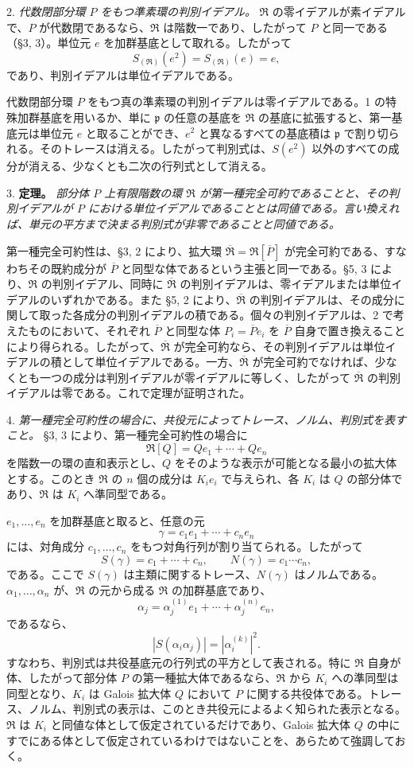 \documentclass[11pt]{article}
\providecommand{\mR}{\mathfrak{R}}
\providecommand{\bR}{\overline{\mathfrak{R}}}
\providecommand{\mpideal}{\mathfrak{p}}
\providecommand{\bP}{\overline{P}}
\begin{document}
2. \emph{代数閉部分環 $P$ をもつ準素環の判別イデアル。} $\mR$ の零イデアルが素イデアルで、$P$ が代数閉であるなら、$\mR$ は階数一であり、したがって $P$ と同一である（\S 3, 3）。単位元 $e$ を加群基底として取れる。したがって
\[
        S_{(\mR)}(e^2)=S_{(\mR)}(e)=e,
\]
であり、判別イデアルは単位イデアルである。

代数閉部分環 $P$ をもつ真の準素環の判別イデアルは零イデアルである。1 の特殊加群基底を用いるか、単に $\mpideal$ の任意の基底を $\mR$ の基底に拡張すると、第一基底元は単位元 $e$ と取ることができ、$e^2$ と異なるすべての基底積は $\mpideal$ で割り切られる。そのトレースは消える。したがって判別式は、$S(e^2)$ 以外のすべての成分が消える、少なくとも二次の行列式として消える。

3. \textbf{定理。} \emph{部分体 $P$ 上有限階数の環 $\mR$ が第一種完全可約であることと、その判別イデアルが $P$ における単位イデアルであることとは同値である。言い換えれば、単元の平方まで決まる判別式が非零であることと同値である。}

第一種完全可約性は、\S 3, 2 により、拡大環 $\bR=\mR[\bP]$ が完全可約である、すなわちその既約成分が $\bP$ と同型な体であるという主張と同一である。\S 5, 3 により、$\mR$ の判別イデアル、同時に $\bR$ の判別イデアルは、零イデアルまたは単位イデアルのいずれかである。また \S 5, 2 により、$\bR$ の判別イデアルは、その成分に関して取った各成分の判別イデアルの積である。個々の判別イデアルは、2 で考えたものにおいて、それぞれ $\bP$ と同型な体 $P_i=\bP e_i$ を $\bP$ 自身で置き換えることにより得られる。したがって、$\bR$ が完全可約なら、その判別イデアルは単位イデアルの積として単位イデアルである。一方、$\bR$ が完全可約でなければ、少なくとも一つの成分は判別イデアルが零イデアルに等しく、したがって $\bR$ の判別イデアルは零である。これで定理が証明された。

4. \emph{第一種完全可約性の場合に、共役元によってトレース、ノルム、判別式を表すこと。} \S 3, 3 により、第一種完全可約性の場合に
\[
        \mR[Q]=Qe_1+\cdots+Qe_n
\]
を階数一の環の直和表示とし、$Q$ をそのような表示が可能となる最小の拡大体とする。このとき $\mR$ の $n$ 個の成分は $K_i e_i$ で与えられ、各 $K_i$ は $Q$ の部分体であり、$\mR$ は $K_i$ へ準同型である。

$e_1,\ldots,e_n$ を加群基底と取ると、任意の元
\[
        \gamma=c_1e_1+\cdots+c_ne_n
\]
には、対角成分 $c_1,\ldots,c_n$ をもつ対角行列が割り当てられる。したがって
\[
        S(\gamma)=c_1+\cdots+c_n,
        \qquad
        N(\gamma)=c_1\cdots c_n,
\]
である。ここで $S(\gamma)$ は主類に関するトレース、$N(\gamma)$ はノルムである。$\alpha_1,\ldots,\alpha_n$ が、$\mR$ の元から成る $\mR$ の加群基底であり、
\[
        \alpha_j=\alpha_j^{(1)}e_1+\cdots+\alpha_j^{(n)}e_n,
\]
であるなら、
\[
        |S(\alpha_i\alpha_j)|=
        \left|\alpha_i^{(k)}\right|^2.
\]
すなわち、判別式は共役基底元の行列式の平方として表される。特に $\mR$ 自身が体、したがって部分体 $P$ の第一種拡大体であるなら、$\mR$ から $K_i$ への準同型は同型となり、$K_i$ は Galois 拡大体 $Q$ において $P$ に関する共役体である。トレース、ノルム、判別式の表示は、このとき共役元によるよく知られた表示となる。$\mR$ は $K_i$ と同値な体として仮定されているだけであり、Galois 拡大体 $Q$ の中にすでにある体として仮定されているわけではないことを、あらためて強調しておく。
\end{document}
